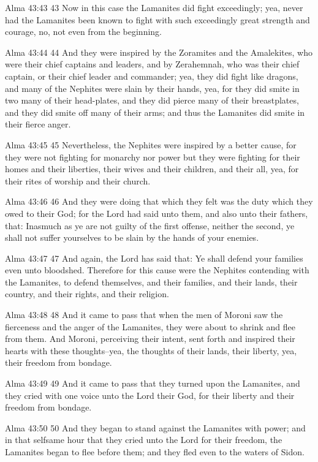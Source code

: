 Alma 43:43
 43 Now in this case the Lamanites did fight exceedingly; yea,
never had the Lamanites been known to fight with such exceedingly
great strength and courage, no, not even from the beginning.

Alma 43:44
 44 And they were inspired by the Zoramites and the Amalekites,
who were their chief captains and leaders, and by Zerahemnah, who
was their chief captain, or their chief leader and commander;
yea, they did fight like dragons, and many of the Nephites were
slain by their hands, yea, for they did smite in two many of
their head-plates, and they did pierce many of their
breastplates, and they did smite off many of their arms; and thus
the Lamanites did smite in their fierce anger.

Alma 43:45
 45 Nevertheless, the Nephites were inspired by a better cause,
for they were not fighting for monarchy nor power but they were
fighting for their homes and their liberties, their wives and
their children, and their all, yea, for their rites of worship
and their church.

Alma 43:46
 46 And they were doing that which they felt was the duty which
they owed to their God; for the Lord had said unto them, and also
unto their fathers, that: Inasmuch as ye are not guilty of the
first offense, neither the second, ye shall not suffer yourselves
to be slain by the hands of your enemies.

Alma 43:47
 47 And again, the Lord has said that: Ye shall defend your
families even unto bloodshed. Therefore for this cause were the
Nephites contending with the Lamanites, to defend themselves, and
their families, and their lands, their country, and their rights,
and their religion.

Alma 43:48
 48 And it came to pass that when the men of Moroni saw the
fierceness and the anger of the Lamanites, they were about to
shrink and flee from them. And Moroni, perceiving their intent,
sent forth and inspired their hearts with these thoughts--yea,
the thoughts of their lands, their liberty, yea, their freedom
from bondage.

Alma 43:49
 49 And it came to pass that they turned upon the Lamanites, and
they cried with one voice unto the Lord their God, for their
liberty and their freedom from bondage.

Alma 43:50
 50 And they began to stand against the Lamanites with power; and
in that selfsame hour that they cried unto the Lord for their
freedom, the Lamanites began to flee before them; and they fled
even to the waters of Sidon.

